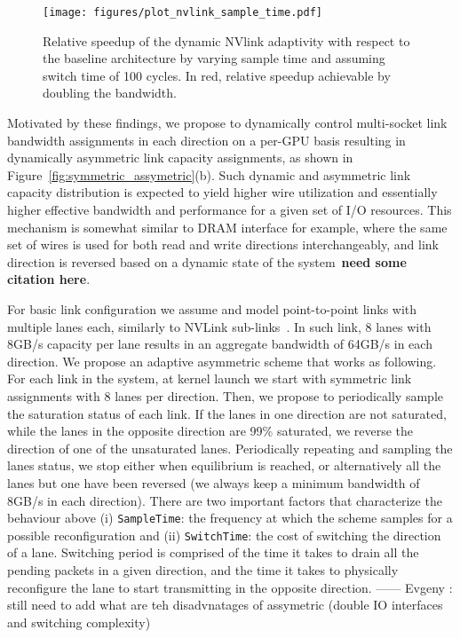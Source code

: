 \begin{figure*}[tp]
    \centering
    \texttt{[image: figures/plot\_nvlink\_sample\_time.pdf]}
    \caption{Relative speedup of the dynamic NVlink adaptivity with respect to
	the baseline architecture by varying sample time and assuming switch time of
	100 cycles. In red, relative speedup achievable by doubling the bandwidth.}
    \label{fig:sampletime}
\end{figure*}

Motivated by these findings, we propose to dynamically control multi-socket
link bandwidth assignments in each direction on a per-GPU basis resulting in
dynamically asymmetric link capacity assignments, as shown in
Figure~\ref{fig:symmetric_assymetric}(b). Such dynamic and asymmetric link
capacity distribution is expected to yield higher wire utilization and
essentially higher effective bandwidth and performance for a given set of I/O
resources. This mechanism is somewhat similar to DRAM interface for example,
where the same set of wires is used for both read and write directions
interchangeably, and link direction is reversed based on a dynamic state of the
system~\textbf{need some citation here}. 

For basic link configuration we assume and model point-to-point
links with multiple lanes each, similarly to NVLink
sub-links~\cite{pascal-tesla-wp}.  In such link, 8 lanes with 8GB/s capacity
per lane results in an aggregate bandwidth of 64GB/s in each direction. We
propose an adaptive asymmetric scheme that works as following. For each link
in the system, at kernel launch we start with symmetric link assignments with 8
lanes per direction. Then, we propose to periodically sample the saturation
status of each link. If the lanes in one direction are not saturated, while the
lanes in the opposite direction are 99\% saturated, we reverse the direction of
one of the unsaturated lanes. Periodically repeating and sampling the lanes
status, we stop either when equilibrium is reached, or alternatively all the 
lanes but one have been reversed (we always keep a minimum bandwidth of 8GB/s 
in each direction).  
There are two important factors that characterize the behaviour above (i) 
\texttt{SampleTime}: the frequency at which the scheme samples for a possible 
reconfiguration and (ii) \texttt{SwitchTime}: the cost of switching the 
direction of a lane. Switching period is comprised of the time it takes to 
drain all the pending packets in a given direction, and the time it takes to 
physically reconfigure the lane to start transmitting in the opposite 
direction. 
------  Evgeny : still need to add what are teh disadvnatages of assymetric
(double IO interfaces and switching complexity)



